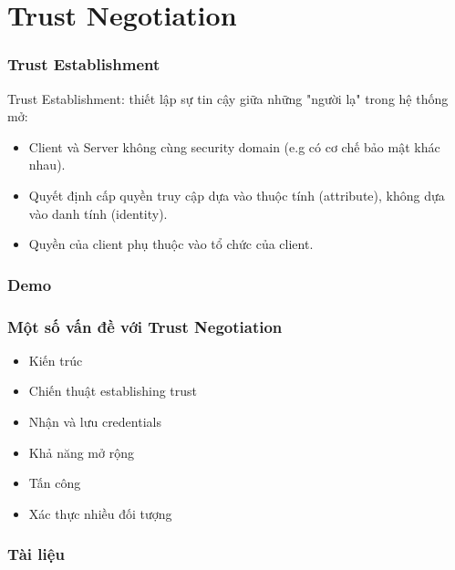 \documentclass[11pt]{beamer}
\begin{document}
\section{Trust Negotiation}
\begin{frame}
\frametitle{Trust Establishment}
Trust Establishment: thiết lập sự tin cậy giữa những "người lạ" trong hệ thống mở:
\begin{itemize}
\item Client và Server không cùng security domain (e.g có cơ chế bảo mật khác nhau).
\item Quyết định cấp quyền truy cập dựa vào thuộc tính (attribute), không dựa vào danh tính (identity).
\item Quyền của client phụ thuộc vào tổ chức của client.
\end{itemize}
\end{frame}


\begin{frame}
\frametitle{Demo}
\end{frame}

\begin{frame}
\frametitle{Một số vấn đề với Trust Negotiation}

\begin{itemize}
\item Kiến trúc%
\item Chiến thuật establishing trust
\item Nhận và lưu credentials
\item Khả năng mở rộng
\item Tấn công\cite{10.1007/3-540-44875-6_20}
\item Xác thực nhiều đối tượng
\end{itemize}
\end{frame}

\begin{frame}
\frametitle{Tài liệu}
\printbibliography
\end{frame}
\end{document}
